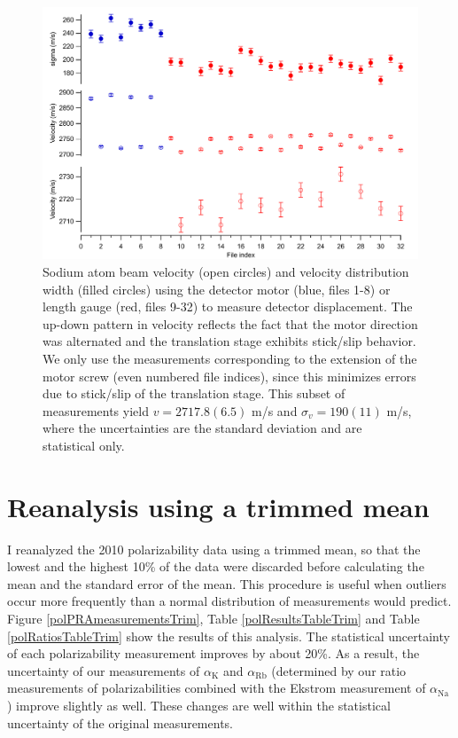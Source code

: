 \begin{figure}
\includegraphics[width=1\textwidth]{Figures/velMotLG.pdf}
\caption[Atom beam velocities measured using a motor encoder and a length gauge.]{\label{velMotLG}Sodium atom beam velocity (open circles) and velocity distribution width (filled circles) using the detector motor (blue, files 1-8) or length gauge (red, files 9-32) to measure detector displacement. The up-down pattern in velocity reflects the fact that the motor direction was alternated and the translation stage exhibits stick/slip behavior. We only use the measurements corresponding to the extension of the motor screw (even numbered file indices), since this minimizes errors due to stick/slip of the translation stage. This subset of measurements yield $v=2717.8(6.5)$ m/s and $\sigma_v=190(11)$ m/s, where the uncertainties are the standard deviation and are statistical only.}
\end{figure}




\section{Reanalysis using a trimmed mean}
\label{trimMean2010}
I reanalyzed the 2010 polarizability data using a trimmed mean, so that the lowest and the highest 10\% of the data were discarded before calculating the mean and the standard error of the mean. This procedure is useful when outliers occur more frequently than a normal distribution of measurements would predict. Figure \ref{polPRAmeasurementsTrim}, Table \ref{polResultsTableTrim} and Table \ref{polRatiosTableTrim} show the results of this analysis. The statistical uncertainty of each polarizability measurement improves by about 20\%. As a result, the uncertainty of our measurements of $\alpha_\textrm{K}$ and $\alpha_\textrm{Rb}$ (determined by our ratio measurements of polarizabilities combined with the Ekstrom \etal measurement of $\alpha_\textrm{Na}$) improve slightly as well. These changes are well within the statistical uncertainty of the original measurements.


